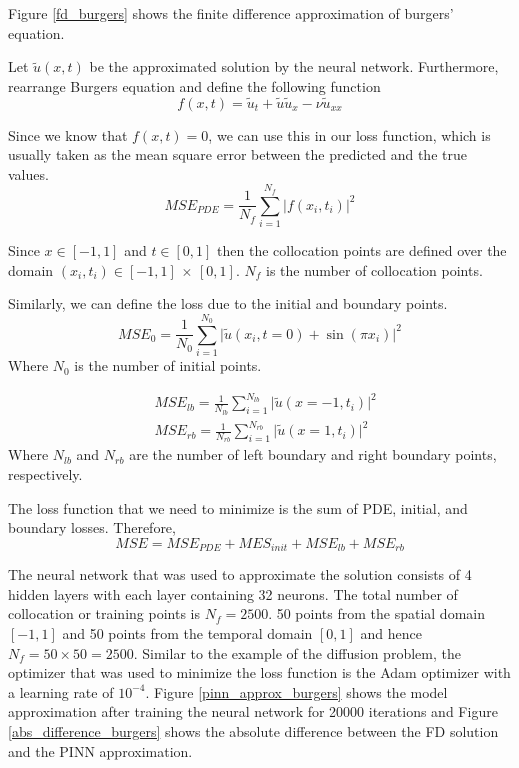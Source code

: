 \documentclass[a4paper, onecolumn, 12pt]{article}
\begin{document}
Figure \ref{fd_burgers} shows the finite difference approximation of burgers' equation.

Let $\tilde{u}(x,t)$ be the approximated solution by the neural network. 
Furthermore, rearrange Burgers equation and define the following function
\begin{equation}
f(x,t) = \tilde{u}_t + \tilde{u} \tilde{u}_x - \nu \tilde{u}_{xx}
\end{equation}

Since we know that $f(x,t) = 0$, we can use this in our loss function, which is usually 
taken as the mean square error between the predicted and the true values.
\begin{equation}
MSE_{PDE} = \frac{1}{N_f} \sum_{i=1}^{N_f} \Big|f(x_i, t_i)\Big|^2
\end{equation}

Since $x\in [-1,1]$ and $t\in [0,1]$ then the collocation points are defined over 
the domain $(x_i, t_i) \in [-1,1] \, \times \, [0,1]$. $N_f$ is the number of collocation points.

Similarly, we can define the loss due to the initial and boundary points.
\begin{equation}
MSE_{0} = \frac{1}{N_0} \sum_{i=1}^{N_0} \Big| \tilde{u}(x_i, t=0) + \sin(\pi x_i)\Big|^2
\end{equation}
Where $N_0$ is the number of initial points.

\begin{equation}
\begin{aligned}
&MSE_{lb} = \frac{1}{N_{lb}} \sum_{i=1}^{N_{lb}} \Big| \tilde{u}(x=-1, t_i) \Big|^2 \\
&MSE_{rb} = \frac{1}{N_{rb}} \sum_{i=1}^{N_{rb}} \Big| \tilde{u}(x=1, t_i) \Big|^2
\end{aligned}
\end{equation}
Where $N_{lb}$ and $N_{rb}$ are the number of left boundary and right boundary points, respectively.

The loss function that we need to minimize is the sum of PDE, initial, and boundary losses. Therefore,
\begin{equation}
MSE = MSE_{PDE} + MES_{init} + MSE_{lb} + MSE_{rb}
\end{equation}

The neural network that was used to approximate the solution consists of 4 hidden layers
with each layer containing 32 neurons. The total number of collocation or training points is $N_f=2500$.
50 points from the spatial domain $[-1, 1]$ and 50 points from the temporal domain $[0, 1]$ and hence 
$N_f = 50 \times 50 = 2500$. Similar to the example of the diffusion problem, the optimizer that was used 
to minimize the loss function is the Adam optimizer with a learning rate of $10^{-4}$. Figure \ref{pinn_approx_burgers} 
shows the model approximation after training the neural network for 20000 iterations and Figure \ref{abs_difference_burgers}
shows the absolute difference between the FD solution and the PINN approximation.
\end{document}
